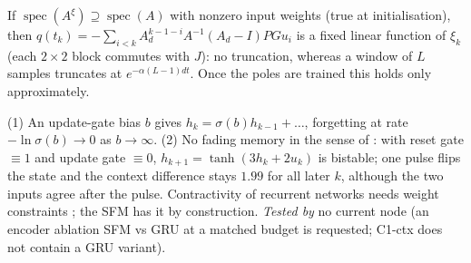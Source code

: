 \begin{remark}
If $\operatorname{spec}(A^\xi)\supseteq\operatorname{spec}(A)$ with nonzero input weights (true at initialisation), then
$q(t_k)=-\sum_{i<k}A_d^{k-1-i}A^{-1}(A_d-I)PGu_i$ is a fixed linear function of $\xi_k$ (each $2\times2$ block commutes
with $J$): no truncation, whereas a window of $L$ samples truncates at $e^{-\alpha(L-1)dt}$. Once the poles are
trained this holds only approximately.
\end{remark}

\begin{remark}
(1) An update-gate bias $b$ gives $h_k=\sigma(b)h_{k-1}+\dots$, forgetting at rate $-\ln\sigma(b)\to0$ as $b\to\infty$.
(2) No fading memory in the sense of \citet{boyd1985fading}: with reset gate $\equiv1$ and update gate $\equiv0$,
$h_{k+1}=\tanh(3h_k+2u_k)$ is bistable; one pulse flips the state and the context difference stays $1.99$ for all
later $k$, although the two inputs agree after the pulse. Contractivity of recurrent networks needs weight
constraints \citep{miller2019stable}; the SFM has it by construction. \emph{Tested by} no current node (an encoder
ablation SFM vs GRU at a matched budget is requested; C1-ctx does not contain a GRU variant).
\end{remark}

